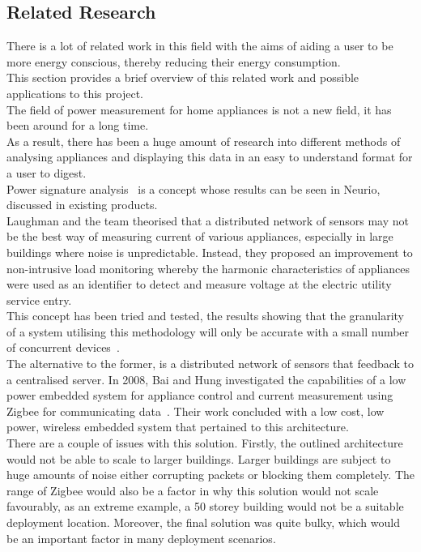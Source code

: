 \documentclass[preprint,12pt,3p]{elsarticle}
\begin{document}
\subsection{Related Research}
There is a lot of related work in this field with the aims of aiding a user to be more energy conscious, thereby reducing their energy consumption.\\
This section provides a brief overview of this related work and possible applications to this project.\\[5pt]
The field of power measurement for home appliances is not a new field, it has been around for a long time.\\ As a result, there has been a huge amount of research into different methods of analysing appliances and displaying this data in an easy to understand format for a user to digest.\\
Power signature analysis~\cite{laughman2003power} is a concept whose results can be seen in Neurio, discussed in existing products.\\ 
Laughman and the team theorised that a distributed network of sensors may not be the best way of measuring current of various appliances, especially in large buildings where noise is unpredictable. Instead, they proposed an improvement to non-intrusive load monitoring whereby the harmonic characteristics of appliances were used as an identifier to detect and measure voltage at the electric utility service entry.\\
This concept has been tried and tested, the results showing that the granularity of a system utilising this methodology will only be accurate with a small number of concurrent devices~\cite{liang2010load}.\\
The alternative to the former, is a distributed network of sensors that feedback to a centralised server. In 2008, Bai and Hung investigated the capabilities of a low power embedded system for appliance control and current measurement using Zigbee for communicating data~\cite{bai2008remote}. Their work concluded with a low cost, low power, wireless embedded system that pertained to this architecture.\\
There are a couple of issues with this solution. Firstly, the outlined architecture would not be able to scale to larger buildings. Larger buildings are subject to huge amounts of noise either corrupting packets or blocking them completely. The range of Zigbee would also be a factor in why this solution would not scale favourably, as an extreme example, a 50 storey building would not be a suitable deployment location. Moreover, the final solution was quite bulky, which would be an important factor in many deployment scenarios.\\ 
\end{document}
